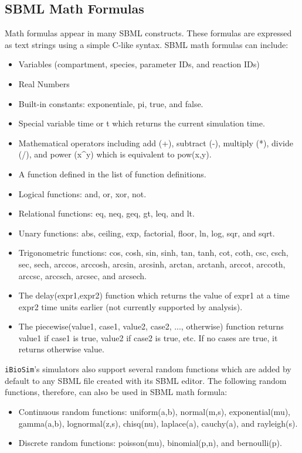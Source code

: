 \documentclass[titlepage,11pt]{article}
\begin{document}
\subsection{\label{SBMLMath}SBML Math Formulas}

\noindent
Math formulas appear in many SBML constructs.  These formulas are 
expressed as text strings using a simple C-like syntax. 
SBML math formulas can include: 
\begin{itemize}
\item Variables (compartment, species, parameter IDs, and reaction IDs)
\item Real Numbers
\item Built-in constants: exponentiale, pi, true, and false.
\item Special variable time or t which returns the current simulation time.
\item Mathematical operators including add (+), subtract (-), multiply
  (*), divide (/), and power (x\^{}y) which is equivalent to pow(x,y).
\item A function defined in the list of function definitions.
\item Logical functions: and, or, xor, not.
\item Relational functions: eq, neq, geq, gt, leq, and lt.
\item Unary functions: abs, ceiling, exp, factorial, floor, ln, log,
  sqr, and sqrt.
\item Trigonometric functions: cos, cosh, sin, sinh, tan, tanh, cot,
  coth, csc, csch, sec, sech, arccos, arccosh, arcsin, arcsinh,
  arctan, arctanh, arccot, arccoth, arccsc, arccsch, arcsec, and arcsech.
\item The delay(expr1,expr2) function which returns the value of expr1 at a time
      expr2 time units earlier (not currently supported by analysis).
\item The piecewise(value1, case1, value2, case2, ..., otherwise)
  function returns value1 if case1 is true, value2 if case2 is true,
  etc.  If no cases are true, it returns otherwise value.
\end{itemize}

{\tt iBioSim}'s simulators also support several random functions which
are added by default to any SBML file created with its SBML editor.  
The following random functions, therefore, can also be used in SBML
math formula:
\begin{itemize}
\item Continuous random functions: uniform(a,b), normal(m,s), exponential(mu), 
  gamma(a,b), lognormal(z,s), chisq(nu), laplace(a), cauchy(a), and 
  rayleigh(s).
\item Discrete random functions: poisson(mu), binomial(p,n), and bernoulli(p).
\end{itemize}
\end{document}
